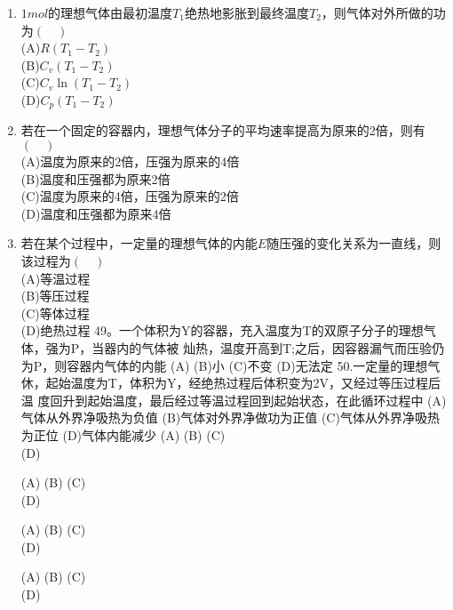 \begin{enumerate}
(A)内能必相等\\
(B)分子的平均动能相同\\
(C)分子的平均平动能相同\\
(D)分子的平均速率相同
\item $1mol$的理想气体由最初温度$T_1$绝热地影胀到最终温度$T_2$，则气体对外所做的功为$(\quad)$\\
(A)$R(T_1-T_2)$\\
(B)$C_v(T_1-T_2)$\\
(C)$C_v\ln (T_1-T_2)$\\
(D)$C_p(T_1-T_2)$\\
\item 若在一个固定的容器内，理想气体分子的平均速率提高为原来的2倍，则有$(\quad)$\\
(A)温度为原来的2倍，压强为原来的4倍\\
(B)温度和压强都为原来2倍\\
(C)温度为原来的4倍，压强为原来的2倍\\
(D)温度和压强都为原来4倍
\item 若在某个过程中，一定量的理想气体的内能$E$随压强的变化关系为一直线，则该过程为$(\quad)$\\
(A)等温过程\\
(B)等压过程\\
(C)等体过程\\
(D)绝热过程
49。一个体积为Y的容器，充入温度为T的双原子分子的理想气体，强为P，当器内的气体被
灿热，温度开高到T;之后，因容器漏气而压验仍为P，则容器内气体的内能
(A)
(B)小
(C)不变
(D)无法定
50.一定量的理想气休，起始温度为T，体积为Y，经绝热过程后体积变为2V，又经过等压过程后温
度回升到起始温度，最后经过等温过程回到起始状态，在此循环过程中
(A)气体从外界净吸热为负值
(B)气体对外界净做功为正值
(C)气体从外界净吸热为正位
(D)气体内能减少
(A)
(B)
(C)\\
(D)


(A)
(B)
(C)\\
(D)


(A)
(B)
(C)\\
(D)


(A)
(B)
(C)\\
(D)
\end{enumerate}